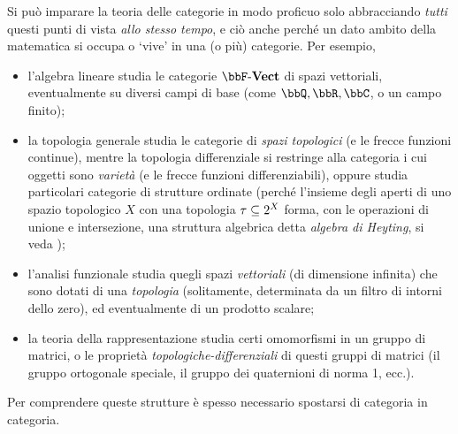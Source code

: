 Si può imparare la teoria delle categorie in modo proficuo solo abbracciando \emph{tutti} questi punti di vista \emph{allo stesso tempo}, e ciò anche perché un dato ambito della matematica si occupa o `vive' in una (o più) categorie. Per esempio,
\begin{itemize}
 \item l'algebra lineare studia le categorie \(\ctVect\) di spazi vettoriali, eventualmente su diversi campi di base (come \(\bbQ,\bbR,\bbC\), o un campo finito);
 \item la topologia generale studia le categorie di \emph{spazi topologici} (e le frecce funzioni continue), mentre la topologia differenziale si restringe alla categoria i cui oggetti sono \emph{varietà} (e le frecce funzioni differenziabili), oppure studia particolari categorie di strutture ordinate (perché l'insieme degli aperti di uno spazio topologico \(X\) con una topologia \(\tau \subseteq 2^{X}\) forma, con le operazioni di unione e intersezione, una struttura algebrica detta \emph{algebra di Heyting}, si veda \cite{Esakia2019});
 \item l'analisi funzionale studia quegli spazi \emph{vettoriali} (di dimensione infinita) che sono dotati di una \emph{topologia} (solitamente, determinata da un filtro di intorni dello zero), ed eventualmente di un prodotto scalare;
 \item la teoria della rappresentazione studia certi omomorfismi in un gruppo di matrici, o le proprietà \emph{topologiche-differenziali} di questi gruppi di matrici (il gruppo ortogonale speciale, il gruppo dei quaternioni di norma 1, ecc.).
\end{itemize}
Per comprendere queste strutture è spesso necessario spostarsi di categoria in categoria.

